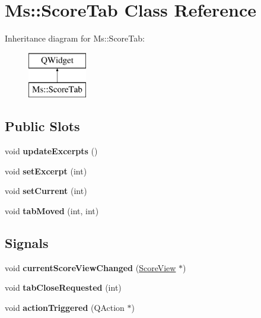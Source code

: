 \hypertarget{class_ms_1_1_score_tab}{}\section{Ms\+:\+:Score\+Tab Class Reference}
\label{class_ms_1_1_score_tab}
Inheritance diagram for Ms\+:\+:Score\+Tab\+:\begin{figure}[H]
\begin{center}
\leavevmode
\includegraphics[height=2.000000cm]{class_ms_1_1_score_tab}
\end{center}
\end{figure}
\subsection*{Public Slots}
\begin{DoxyCompactItemize}
\item 
\mbox{\label{class_ms_1_1_score_tab_afa6ef5ce05857c4f51fb74488eacceba}} 
void {\bfseries update\+Excerpts} ()
\item 
\mbox{\label{class_ms_1_1_score_tab_abc294ce78eb8408e9c91af9a07a045b7}} 
void {\bfseries set\+Excerpt} (int)
\item 
\mbox{\label{class_ms_1_1_score_tab_afa4379bb9f41d77ebaaa680ee7a6f164}} 
void {\bfseries set\+Current} (int)
\item 
\mbox{\label{class_ms_1_1_score_tab_acffdaca76135768bba41d4b06a52d2b1}} 
void {\bfseries tab\+Moved} (int, int)
\end{DoxyCompactItemize}
\subsection*{Signals}
\begin{DoxyCompactItemize}
\item 
\mbox{\label{class_ms_1_1_score_tab_a0875c6aeca1f75047cdeec2baafe931e}} 
void {\bfseries current\+Score\+View\+Changed} (\hyperlink{class_ms_1_1_score_view}{Score\+View} $\ast$)
\item 
\mbox{\label{class_ms_1_1_score_tab_afde23edc2df8fe951f99697e8ae5a46e}} 
void {\bfseries tab\+Close\+Requested} (int)
\item 
\mbox{\label{class_ms_1_1_score_tab_aa82e1089d36bdae7504e1890788012f7}} 
void {\bfseries action\+Triggered} (Q\+Action $\ast$)
\end{DoxyCompactItemize}
